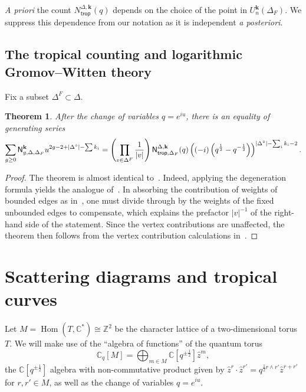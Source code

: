 \documentclass[11pt]{amsart}
\numberwithin{equation}{section}
\theoremstyle{plain}
\newtheorem{theorem}{Theorem}[section]
\theoremstyle{remark}
\theoremstyle{definition}
\DeclareMathOperator{\Hom}{Hom}
\newcommand\bk{\mathbf{k}}
\newcommand{\CC}{\mathbb{C}}
\newcommand{\ZZ}{\mathbb{Z}}
\newcommand{\Ntrop}{{N}_{\mathsf{trop}}^{\Delta,\bk}}
\begin{document}
\textit{A priori} the count $\Ntrop(q)$ depends on the choice of the point in $U_{n}^\bk(\Delta_F)$. We suppress this dependence from our notation as it is independent \textit{a posteriori}.


\subsection{The tropical counting and logarithmic Gromov--Witten theory}
Fix a subset $\Delta^F \subset \Delta$. 

\begin{theorem}\label{thm : bdyrefined} After the change of variables $q=e^{iu}$, there is an equality of generating series
$$\sum_{g \geq 0} \mathsf{N}_{g,\Delta,\Delta_F}^{\bf{k}}u^{2g -2 + |\Delta^{\circ}| - \sum k_i} =  \left(\prod_{v\in \Delta^F}\frac{1}{|v|}\right)\mathsf{N}^{\Delta,\bf{k}}_{\mathsf{trop},\Delta_F}(q)\left((-i)\left(q^{\frac{1}{2}} - q^{-\frac{1}{2}}\right)\right)^{|\Delta^{\circ}| - \sum_i k_i - 2}.$$ 
\end{theorem}

\begin{proof}
    The theorem is almost identical to~\cite[Theorem A]{kennedyhunt2023tropical}. Indeed, applying the degeneration formula yields the analogue of~\cite[Proposition 3.4.2]{kennedyhunt2023tropical}. In absorbing the contribution of weights of bounded edges as in~\cite[Section 6.1]{kennedyhunt2023tropical}, one must divide through by the weights of the fixed unbounded edges to compensate, which explains the prefactor $|v|^{-1}$ of the right-hand side of the statement. Since the vertex contributions are unaffected, the theorem then follows from the vertex contribution calculations in~\cite[Section 6.2]{kennedyhunt2023tropical}.
\end{proof}


\section{Scattering diagrams and tropical curves}\label{Section : scattering}
Let $M = \Hom(T,\CC^*) \cong \ZZ^2$ be the character lattice of a two-dimensional torus $T$. We will make use of the ``algebra of functions'' of the quantum torus $$\CC_q[M] = \bigoplus_{m \in M} \CC\left[q^{\pm \frac{1}{2}}\right] \hat{z}^m,$$ the $\CC[q^{\pm \frac{1}{2}}]$ algebra with non-commutative product given by $\hat{z}^{r} \cdot \hat{z}^{r'} = q^{\frac{1}{2}r \wedge r'}\hat{z}^{r+r'}$ for $r,r' \in M$, as well as the change of variables $q = e^{iu}$.
\end{document}
